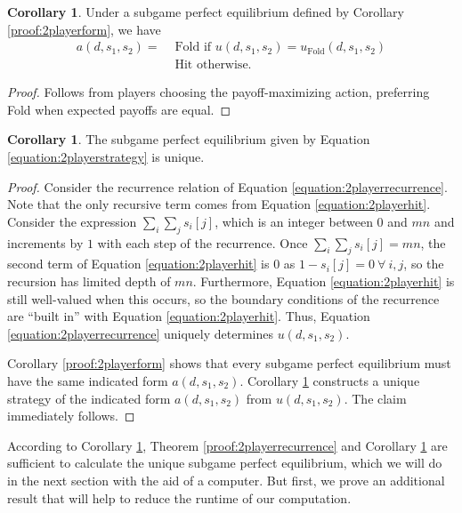\documentclass{article}
\theoremstyle{definition}
\newcounter{a}
\newtheorem{corollary}[a]{Corollary}
\begin{document}
\begin{corollary}
Under a subgame perfect equilibrium defined by Corollary \ref{proof:2playerform}, we have
\begin{equation}\begin{split}
a(d,s_1, s_2) = &\text{ Fold} \text{ if } u(d,s_1, s_2) = u_{\text{Fold}} (d,s_1, s_2) \\
&\text{ Hit} \text{ otherwise}.
\label{equation:2playerstrategy}
\end{split}\end{equation}
\begin{proof}
Follows from players choosing the payoff-maximizing action, preferring Fold when expected payoffs are equal.
\end{proof}
\label{proof:2playerstrategy}
\end{corollary}

\begin{corollary}
The subgame perfect equilibrium given by Equation \ref{equation:2playerstrategy} is unique.
\begin{proof}
Consider the recurrence relation of Equation \ref{equation:2playerrecurrence}. Note that the only recursive term comes from Equation \ref{equation:2playerhit}. Consider the expression $\sum_i \sum_j s_i [j]$, which is an integer between $0$ and $mn$ and increments by $1$ with each step of the recurrence. Once $\sum_i \sum_j s_i [j] = mn$, the second term of Equation \ref{equation:2playerhit} is $0$ as $1-s_i [j] = 0 \: \forall \: i,j$, so the recursion has limited depth of $mn$. Furthermore, Equation \ref{equation:2playerhit} is still well-valued when this occurs, so the boundary conditions of the recurrence are ``built in'' with Equation \ref{equation:2playerhit}. Thus, Equation \ref{equation:2playerrecurrence} uniquely determines $u(d,s_1, s_2)$.

Corollary \ref{proof:2playerform} shows that every subgame perfect equilibrium must have the same indicated form $a(d,s_1, s_2)$. Corollary \ref{proof:2playerstrategy} constructs a unique strategy of the indicated form $a(d,s_1, s_2)$ from $u(d,s_1, s_2)$. The claim immediately follows. 
\end{proof}
\label{proof:2playeruniqueness}
\end{corollary}

According to Corollary \ref{proof:2playeruniqueness}, Theorem \ref{proof:2playerrecurrence} and Corollary \ref{proof:2playerstrategy} are sufficient to calculate the unique subgame perfect equilibrium, which we will do in the next section with the aid of a computer. But first, we prove an additional result that will help to reduce the runtime of our computation.
\end{document}
